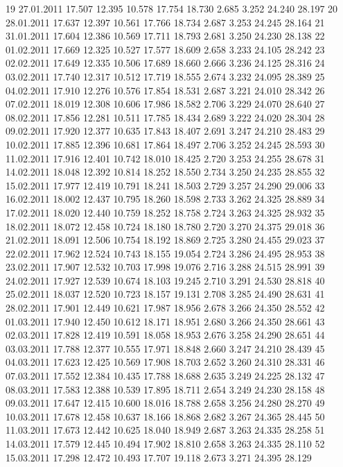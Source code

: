 \documentclass[a4paper,11pt]{scrartcl}
\begin{document}
\begin{Schunk}
\begin{Soutput}
19  27.01.2011 17.507 12.395 10.578 17.754 18.730  2.685  3.252 24.240 28.197
20  28.01.2011 17.637 12.397 10.561 17.766 18.734  2.687  3.253 24.245 28.164
21  31.01.2011 17.604 12.386 10.569 17.711 18.793  2.681  3.250 24.230 28.138
22  01.02.2011 17.669 12.325 10.527 17.577 18.609  2.658  3.233 24.105 28.242
23  02.02.2011 17.649 12.335 10.506 17.689 18.660  2.666  3.236 24.125 28.316
24  03.02.2011 17.740 12.317 10.512 17.719 18.555  2.674  3.232 24.095 28.389
25  04.02.2011 17.910 12.276 10.576 17.854 18.531  2.687  3.221 24.010 28.342
26  07.02.2011 18.019 12.308 10.606 17.986 18.582  2.706  3.229 24.070 28.640
27  08.02.2011 17.856 12.281 10.511 17.785 18.434  2.689  3.222 24.020 28.304
28  09.02.2011 17.920 12.377 10.635 17.843 18.407  2.691  3.247 24.210 28.483
29  10.02.2011 17.885 12.396 10.681 17.864 18.497  2.706  3.252 24.245 28.593
30  11.02.2011 17.916 12.401 10.742 18.010 18.425  2.720  3.253 24.255 28.678
31  14.02.2011 18.048 12.392 10.814 18.252 18.550  2.734  3.250 24.235 28.855
32  15.02.2011 17.977 12.419 10.791 18.241 18.503  2.729  3.257 24.290 29.006
33  16.02.2011 18.002 12.437 10.795 18.260 18.598  2.733  3.262 24.325 28.889
34  17.02.2011 18.020 12.440 10.759 18.252 18.758  2.724  3.263 24.325 28.932
35  18.02.2011 18.072 12.458 10.724 18.180 18.780  2.720  3.270 24.375 29.018
36  21.02.2011 18.091 12.506 10.754 18.192 18.869  2.725  3.280 24.455 29.023
37  22.02.2011 17.962 12.524 10.743 18.155 19.054  2.724  3.286 24.495 28.953
38  23.02.2011 17.907 12.532 10.703 17.998 19.076  2.716  3.288 24.515 28.991
39  24.02.2011 17.927 12.539 10.674 18.103 19.245  2.710  3.291 24.530 28.818
40  25.02.2011 18.037 12.520 10.723 18.157 19.131  2.708  3.285 24.490 28.631
41  28.02.2011 17.901 12.449 10.621 17.987 18.956  2.678  3.266 24.350 28.552
42  01.03.2011 17.940 12.450 10.612 18.171 18.951  2.680  3.266 24.350 28.661
43  02.03.2011 17.828 12.419 10.591 18.058 18.953  2.676  3.258 24.290 28.651
44  03.03.2011 17.788 12.377 10.555 17.971 18.848  2.660  3.247 24.210 28.439
45  04.03.2011 17.623 12.425 10.569 17.908 18.703  2.652  3.260 24.310 28.331
46  07.03.2011 17.552 12.384 10.435 17.788 18.688  2.635  3.249 24.225 28.132
47  08.03.2011 17.583 12.388 10.539 17.895 18.711  2.654  3.249 24.230 28.158
48  09.03.2011 17.647 12.415 10.600 18.016 18.788  2.658  3.256 24.280 28.270
49  10.03.2011 17.678 12.458 10.637 18.166 18.868  2.682  3.267 24.365 28.445
50  11.03.2011 17.673 12.442 10.625 18.040 18.949  2.687  3.263 24.335 28.258
51  14.03.2011 17.579 12.445 10.494 17.902 18.810  2.658  3.263 24.335 28.110
52  15.03.2011 17.298 12.472 10.493 17.707 19.118  2.673  3.271 24.395 28.129

\end{Soutput}
\end{Schunk}
\end{document}
